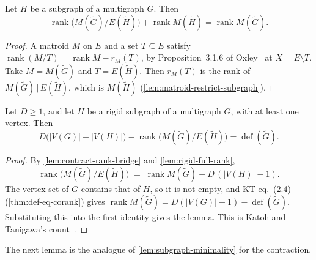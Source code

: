 \begin{lemma}
  \label{lem:contract-rank-bridge}
  \leanok
  Let $H$ be a subgraph of a multigraph $G$. Then
  \[
    \operatorname{rank}\bigl(M(\tilde G) / E(\tilde H)\bigr)
      + \operatorname{rank} M(\tilde H)
      = \operatorname{rank} M(\tilde G).
  \]
\end{lemma}
\begin{proof}
  \leanok
  A matroid $M$ on $E$ and a set $T \subseteq E$ satisfy
  $\operatorname{rank}(M/T) = \operatorname{rank} M - r_M(T)$, by
  Proposition~3.1.6 of Oxley~\cite{oxley2011} at $X = E \setminus T$.
  Take $M = M(\tilde G)$ and $T = E(\tilde H)$. Then $r_M(T)$ is the
  rank of $M(\tilde G)\,|\,E(\tilde H)$, which is $M(\tilde H)$
  (\cref{lem:matroid-restrict-subgraph}).
\end{proof}

\begin{lemma}
  \label{lem:contract-deficiency-conservation}
  \leanok
  Let $D \ge 1$, and let $H$ be a rigid subgraph of a multigraph $G$,
  with at least one vertex. Then
  \[
    D\bigl(|V(G)| - |V(H)|\bigr) -
    \operatorname{rank}\bigl(M(\tilde G) / E(\tilde H)\bigr)
      = \operatorname{def}(\tilde G).
  \]
\end{lemma}
\begin{proof}
  \leanok
  By \cref{lem:contract-rank-bridge} and \cref{lem:rigid-full-rank},
  \[
    \operatorname{rank}\bigl(M(\tilde G) / E(\tilde H)\bigr) \;=\;
    \operatorname{rank} M(\tilde G) - D\,(|V(H)| - 1).
  \]
  The vertex set of $G$ contains that of $H$, so it is not empty, and
  KT eq.~(2.4) (\cref{thm:def-eq-corank}) gives
  $\operatorname{rank} M(\tilde G) = D(|V(G)| - 1) -
  \operatorname{def}(\tilde G)$. Substituting this into the first
  identity gives the lemma. This is Katoh and Tanigawa's
  count~\cite[p.~658]{katohTanigawa2011}.
\end{proof}

The next lemma is the analogue of \cref{lem:subgraph-minimality} for
the contraction.

